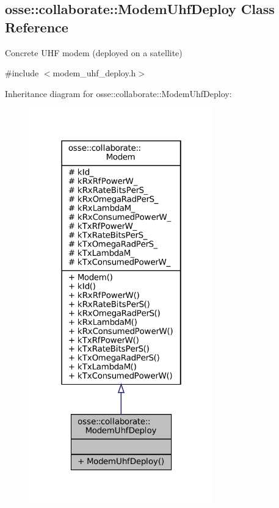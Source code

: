 \hypertarget{classosse_1_1collaborate_1_1_modem_uhf_deploy}{}\subsection{osse\+:\+:collaborate\+:\+:Modem\+Uhf\+Deploy Class Reference}
\label{classosse_1_1collaborate_1_1_modem_uhf_deploy}


Concrete U\+HF modem (deployed on a satellite)  




{\ttfamily \#include $<$modem\+\_\+uhf\+\_\+deploy.\+h$>$}



Inheritance diagram for osse\+:\+:collaborate\+:\+:Modem\+Uhf\+Deploy\+:
\nopagebreak
\begin{figure}[H]
\begin{center}
\leavevmode
\includegraphics[width=226pt]{classosse_1_1collaborate_1_1_modem_uhf_deploy__inherit__graph}
\end{center}
\end{figure}
